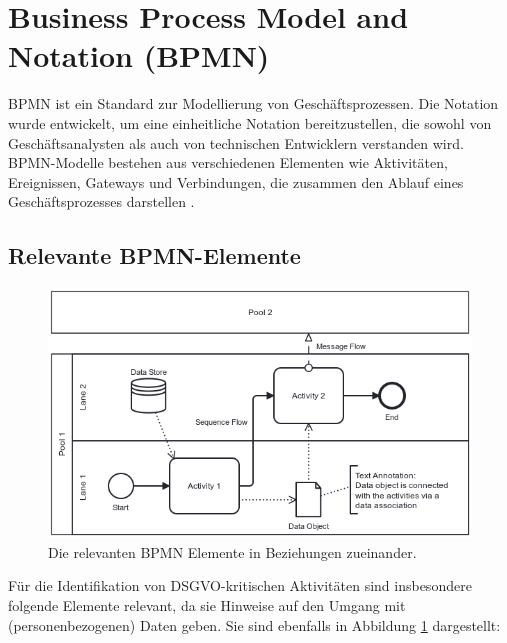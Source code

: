 \section{Business Process Model and Notation (BPMN)}\label{sec:bpmn}

\ac{BPMN} ist ein Standard zur Modellierung von Geschäftsprozessen. Die Notation wurde entwickelt, um eine einheitliche Notation bereitzustellen, die sowohl von Geschäftsanalysten als auch von technischen Entwicklern verstanden wird. \ac{BPMN}-Modelle bestehen aus verschiedenen Elementen wie Aktivitäten, Ereignissen, Gateways und Verbindungen, die zusammen den Ablauf eines Geschäftsprozesses darstellen \cite{omgbpmn}.

\subsection*{Relevante BPMN-Elemente}

\begin{figure}
    \centering
    \includegraphics[width=.65\linewidth]{images/process-models/bpmn-elements-showcase-en}
    \caption{Die relevanten BPMN Elemente in Beziehungen zueinander.}
    \label{fig:bpmn-elements-showcase}
\end{figure}

Für die Identifikation von \ac{DSGVO}-kritischen Aktivitäten sind insbesondere folgende Elemente relevant, da sie Hinweise auf den Umgang mit (personenbezogenen) Daten geben. Sie sind ebenfalls in Abbildung \ref{fig:bpmn-elements-showcase} dargestellt:

